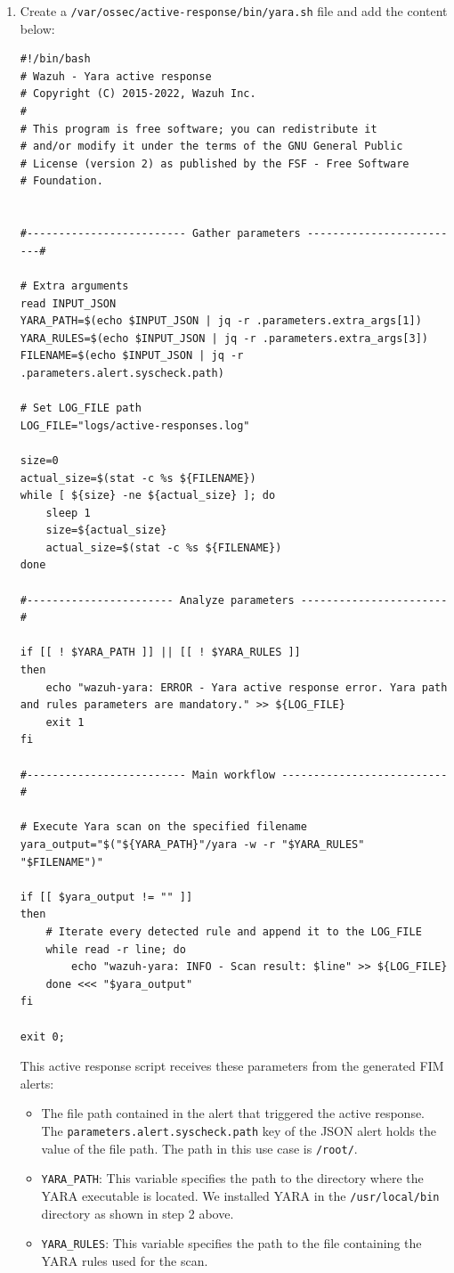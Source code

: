 \begin{enumerate}
    \item Create a \texttt{/var/ossec/active-response/bin/yara.sh} file and add the content below:
    \begin{verbatim}
#!/bin/bash
# Wazuh - Yara active response
# Copyright (C) 2015-2022, Wazuh Inc.
#
# This program is free software; you can redistribute it
# and/or modify it under the terms of the GNU General Public
# License (version 2) as published by the FSF - Free Software
# Foundation.


#------------------------- Gather parameters -------------------------#

# Extra arguments
read INPUT_JSON
YARA_PATH=$(echo $INPUT_JSON | jq -r .parameters.extra_args[1])
YARA_RULES=$(echo $INPUT_JSON | jq -r .parameters.extra_args[3])
FILENAME=$(echo $INPUT_JSON | jq -r .parameters.alert.syscheck.path)

# Set LOG_FILE path
LOG_FILE="logs/active-responses.log"

size=0
actual_size=$(stat -c %s ${FILENAME})
while [ ${size} -ne ${actual_size} ]; do
    sleep 1
    size=${actual_size}
    actual_size=$(stat -c %s ${FILENAME})
done

#----------------------- Analyze parameters -----------------------#

if [[ ! $YARA_PATH ]] || [[ ! $YARA_RULES ]]
then
    echo "wazuh-yara: ERROR - Yara active response error. Yara path and rules parameters are mandatory." >> ${LOG_FILE}
    exit 1
fi

#------------------------- Main workflow --------------------------#

# Execute Yara scan on the specified filename
yara_output="$("${YARA_PATH}"/yara -w -r "$YARA_RULES" "$FILENAME")"

if [[ $yara_output != "" ]]
then
    # Iterate every detected rule and append it to the LOG_FILE
    while read -r line; do
        echo "wazuh-yara: INFO - Scan result: $line" >> ${LOG_FILE}
    done <<< "$yara_output"
fi

exit 0;        
    \end{verbatim}

This active response script receives these parameters from the generated FIM alerts:
\begin{itemize}
    \item The file path contained in the alert that triggered the active response. The \texttt{parameters.alert.syscheck.path} key of the JSON alert holds the value of the file path. The path in this use case is \texttt{/root/}.
    \item \texttt{YARA\_PATH}: This variable specifies the path to the directory where the YARA executable is located. We installed YARA in the \texttt{/usr/local/bin} directory as shown in step 2 above.
    \item \texttt{YARA\_RULES}: This variable specifies the path to the file containing the YARA rules used for the scan.
\end{itemize}


\end{enumerate}
